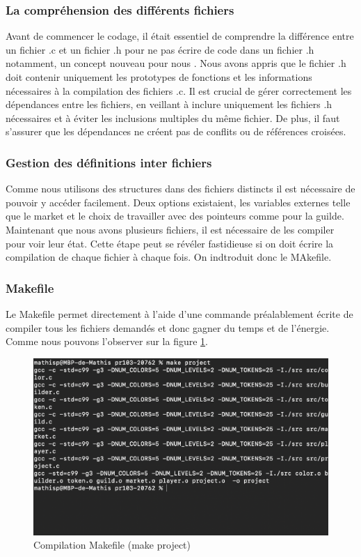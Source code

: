 \documentclass{article}
\begin{document}
\subsubsection{La compréhension des différents fichiers}

\hspace{1em} Avant de commencer le codage, il était essentiel de comprendre la différence entre un fichier .c et un fichier .h pour ne pas écrire de code dans un fichier .h notamment, un concept nouveau pour nous . Nous avons appris que le fichier .h doit contenir uniquement les prototypes de fonctions et les informations nécessaires à la compilation des fichiers .c. Il est crucial de gérer correctement les dépendances entre les fichiers, en veillant à inclure uniquement les fichiers .h nécessaires et à éviter les inclusions multiples du même fichier. De plus, il faut s'assurer que les dépendances ne créent pas de conflits ou de références croisées.


\subsubsection{Gestion des définitions inter fichiers}

\vspace{1em}
\hspace{1em} Comme nous utilisons des structures dans des fichiers distincts il est nécessaire de pouvoir y accéder facilement. Deux options existaient, les variables externes telle que le market et le choix de travailler avec des pointeurs comme pour la guilde.\\ 

Maintenant que nous avons plusieurs fichiers, il est nécessaire de les compiler pour voir leur état. Cette étape peut se révéler fastidieuse si on doit écrire la compilation de chaque fichier à chaque fois. On indtroduit donc le MAkefile.

\subsubsection{Makefile}

\hspace{1em} Le Makefile permet directement à l'aide d'une commande préalablement écrite de compiler tous les fichiers demandés et donc gagner du temps et de l'énergie. Comme nous pouvons l'observer sur la figure \ref{fig:project}.
\begin{figure}[ht]
    \centering
    \includegraphics[width=0.40\linewidth]{Make Project.png}
    \caption{Compilation Makefile (make project)}
    \label{fig:project}
\end{figure}
\end{document}
